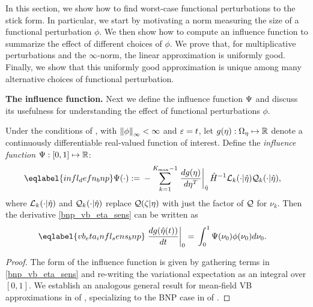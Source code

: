 In this section, we show how to find worst-case functional perturbations to the
stick form. In particular, we start by motivating a norm measuring the size
of a functional perturbation $\phi$. We then show how to compute an influence
function to summarize the effect of different choices of $\phi$. We prove that,
for multiplicative perturbations and the $\infty$-norm, the linear approximation
is uniformly good. Finally, we show that this uniformly good approximation is
unique among many alternative choices of functional perturbation.

\noindent \textbf{The influence function.}
%
Next we define the influence function $\Psi$ and discuss its usefulness for
understanding the effect of functional perturbations $\phi$.
%
\begin{cor}
%
Under the conditions of , with $\left\Vert\phi\right\Vert_{\infty} < \infty$ and
$\varepsilon = t$, let $g(\eta): \Omega_{\eta} \mapsto \mathbb{R}$ denote a
continuously differentiable real-valued function of interest.  Define the
\emph{influence function} $\Psi: [0,1] \mapsto \mathbb{R}$:
%
\begin{align} \eqlabel{infl_defn_bnp}
%
\infl(\cdot) :={}&
    - \sum_{k=1}^{\kmax-1} \fracat{d g(\eta)}{ d \eta^T}{\etaopt} \hessopt^{-1}
        \lqgradbark{\cdot \vert \etaopt}
        \qk(\cdot \vert \etaopt),
%
\end{align} where $\mathcal{L}_k({\cdot \vert \hat\eta})$ and $\mathcal{Q}_k(\cdot \vert
\hat\eta)$ replace $\mathcal{Q}(\zeta \vert \eta)$ with just the factor of $\mathcal{Q}$ for
$\nu_k$.
%
Then the derivative \eqref{bnp_vb_eta_sens} can be written as
%
\begin{align} \eqlabel{vb_eta_infl_sens_bnp}
%
\fracat{d \g(\etaopt(\t))}{d \t}{0} ={}&
    \int_0^1 \infl(\nu_0) \phi(\nu_0) d\nu_0.
%
\end{align}
\end{cor}
%
\begin{proof}
%
The form of the influence function is given by gathering terms in
\eqref{bnp_vb_eta_sens} and re-writing the variational expectation as an
integral over $[0,1]$. We establish an analogous general result for mean-field
VB approximations in  of
, specializing to the BNP case in
 of .
%
\end{proof}

